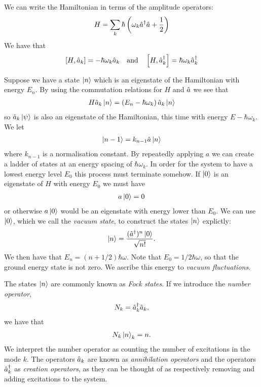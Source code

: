 We can write the Hamiltonian in terms of the amplitude operators:
\begin{align}
  H = \sum_k \hbar \left( \omega_k \hat{a}^\dagger\hat{a} +\frac{1}{2} \right)
\end{align}
We have that
\begin{align}
  \left[H, \hat{a}_k\right] = -\hbar \omega_k \hat{a}_k
  \quad \text{and} \quad 
  \left[H, \hat{a}^\dagger_k\right] = \hbar \omega_k \hat{a}^\dagger_k
\end{align}

Suppose we have a state $\left\vert n\right\rangle$ which is an eigenstate of the Hamiltonian with energy $E_n$. By using the commutation relations for $H$ and $\hat{a}$ we see that
\begin{align}
  H\hat{a}_k\left\vert n\right\rangle = \left(E_n - \hbar \omega_k\right) \hat{a}_k\left\vert n\right\rangle
\end{align}
so $\hat{a}_k\left\vert\psi\right\rangle$ is also an eigenstate of the Hamiltonian, this time with energy $E - \hbar\omega_k$. We let 
\begin{align}
  \left\vert n-1\right\rangle = k_{n-1}\hat{a} \left\vert n\right\rangle
\end{align}
where $k_{n-1}$ is a normalisation constant. By repeatedly applying $a$ we can create a ladder of states at an energy spacing of $\hbar\omega_k$. In order for the system to have a lowest energy level $E_0$ this process must terminate somehow. If $\left\vert0\right\rangle$ is an eigenstate of $H$ with energy $E_0$ we must have
\begin{align}
  a\left\vert0\right\rangle = 0
\end{align}
or otherwise $a\left\vert0\right\rangle$ would be an eigenstate with energy lower than $E_0$. We can use $\left\vert0\right\rangle$, which we call the \textit{vacuum state}, to construct the states $\left\vert n\right\rangle$ explictly:
\begin{align}
  \left\vert n\right\rangle = \frac{(\hat{a}^\dagger)^n \left\vert0\right\rangle}{\sqrt{n!}}. 
\end{align}
We then have that $E_n = (n+1/2)\hbar\omega$. Note that $E_0 = 1/2\hbar \omega$, so that the ground energy state is not zero. We ascribe this energy to \textit{vacuum fluctuations}.

The states $\left\vert n\right\rangle$ are commonly known as \textit{Fock states}. If we introduce the \textit{number operator},
\begin{align}
  N_k = \hat{a}^\dagger_k\hat{a}_k,
\end{align}
we have that
\begin{align}
  N_k\left\vert n\right\rangle_k = n.
\end{align}
We interpret the number operator as counting the number of excitations in the mode $k$. The operators $\hat{a}_k$ are known as \textit{annihilation operators} and the operators $\hat{a}^\dagger_k$ as \textit{creation operators}, as they can be thought of as respectively removing and adding excitations to the system. 

